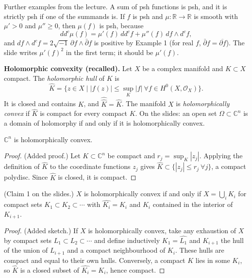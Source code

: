\noindent
Further examples from the lecture. A sum of
psh functions is psh, and it is strictly psh
if one of the summands is. If $f$ is psh and
$\mu\colon\mathbb{R}\to\mathbb{R}$ is smooth
with $\mu'>0$ and $\mu''\geq0$, then $\mu(f)$
is psh, because
$$
dd^c\mu(f)=\mu'(f)\,dd^cf+\mu''(f)\,df
\wedge d^cf,
$$
and $df\wedge d^cf=2\sqrt{-1}\,\partial
f\wedge\bar\partial f$ is positive by Example
1 (for real $f$, $\bar\partial
f=\overline{\partial f}$). The slide writes
$\mu'(f)^2$ in the first term; it should be
$\mu'(f)$.

\medskip\noindent
{\bf Holomorphic convexity (recalled).} Let
$X$ be a complex manifold and $K\subset X$
compact. The \emph{holomorphic hull} of $K$
is
$$
\widehat K=\{z\in X \mid |f(z)|\leq\sup_K|f| 
\ \forall f\in H^0(X,\mathcal{O}_X)\}.
$$
It is closed and contains $K$, and
$\widehat{\widehat K}=\widehat K$. The
manifold $X$ is \emph{holomorphically convex}
if $\widehat K$ is compact for every compact
$K$. On the slides: an open set
$\Omega\subset\mathbb{C}^n$ is a domain of
holomorphy if and only if it is
holomorphically convex.

\begin{lemma}
\label{lemma-cn-holomorphically-convex}
$\mathbb{C}^n$ is holomorphically convex.
\end{lemma}

\begin{proof}
(Added proof.) Let $K\subset\mathbb{C}^n$
be compact and $r_j=\sup_K|z_j|$. Applying
the definition of $\widehat K$ to the
coordinate functions $z_j$ gives $\widehat
K\subset\{|z_j|\leq r_j \ \forall j\}$, a
compact polydisc. Since $\widehat K$ is
closed, it is compact.
\end{proof}

\begin{lemma}
\label{lemma-exhaustion-hull-convex}
(Claim 1 on the slides.) $X$ is
holomorphically convex if and only if
$X=\bigcup_i K_i$ for compact sets
$K_1\subset K_2\subset\cdots$ with
$\widehat{K_i}=K_i$ and $K_i$ contained in
the interior of $K_{i+1}$.
\end{lemma}

\begin{proof}
(Added sketch.) If $X$ is holomorphically
convex, take any exhaustion of $X$ by compact
sets $L_1\subset L_2\subset\cdots$ and define
inductively $K_1=\widehat{L_1}$ and $K_{i+1}$
the hull of the union of $L_{i+1}$ and a
compact neighbourhood of $K_i$. These hulls
are compact and equal to their own hulls.
Conversely, a compact $K$ lies in some $K_i$,
so $\widehat K$ is a closed subset of
$\widehat{K_i}=K_i$, hence compact.
\end{proof}

